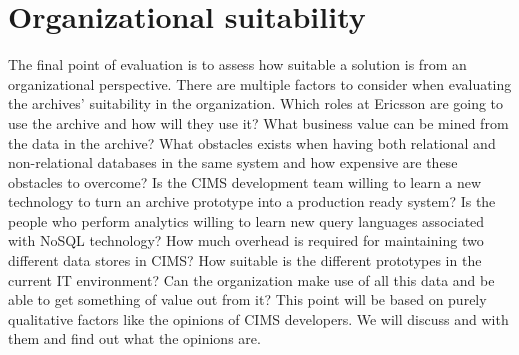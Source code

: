 \section{Organizational suitability}
The final point of evaluation is to assess how suitable a solution is from an organizational perspective. There are multiple factors to consider when evaluating the archives' suitability in the organization. Which roles at Ericsson are going to use the archive and how will they use it? What business value can be mined from the data in the archive? What obstacles exists when having both relational and non-relational databases in the same system and how expensive are these obstacles to overcome? Is the CIMS development team willing to learn a new technology to turn an archive prototype into a production ready system? Is the people who perform analytics willing to learn new query languages associated with NoSQL technology? How much overhead is required for maintaining two different data stores in CIMS? How suitable is the different prototypes in the current IT environment? Can the organization make use of all this data and be able to get something of value out from it? 
This point will be based on purely qualitative factors like the opinions of CIMS developers. We will discuss and with them and find out what the opinions are.

